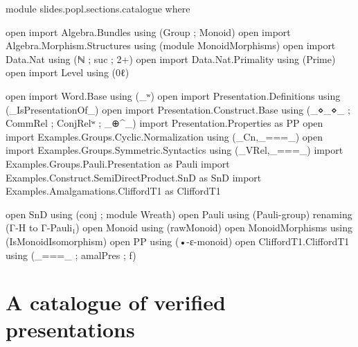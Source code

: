 \begin{code}[hide]
module slides.popl.sections.catalogue where

open import Algebra.Bundles using (Group ; Monoid)
open import Algebra.Morphism.Structures using (module MonoidMorphisms)
open import Data.Nat using (ℕ ; suc ; 2+)
open import Data.Nat.Primality using (Prime)
open import Level using (0ℓ)

open import Word.Base using (_ʷ)
open import Presentation.Definitions using (_IsPresentationOf_)
open import Presentation.Construct.Base using (_⋄_⋄_ ; CommRel ; ConjRelʷ ; _⊕^_)
import Presentation.Properties as PP
open import Examples.Groups.Cyclic.Normalization using (_Cn,_===_)
open import Examples.Groups.Symmetric.Syntactics using (_VRel,_===_)
import Examples.Groups.Pauli.Presentation as Pauli
import Examples.Construct.SemiDirectProduct.SnD as SnD
import Examples.Amalgamations.CliffordT1 as CliffordT1

open SnD using (conj ; module Wreath)
open Pauli using (Pauli-group) renaming (Γ-H to Γ-Pauli₁)
open Monoid using (rawMonoid)
open MonoidMorphisms using (IsMonoidIsomorphism)
open PP using (•-ε-monoid)
open CliffordT1.CliffordT1 using (_===_ ; amalPres ; f)
\end{code}
\section{A catalogue of verified presentations}


